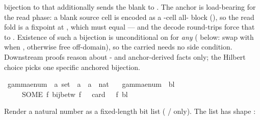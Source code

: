 \begin{isabellebody}
\begin{isamarkuptext}
  bijection to  that additionally sends the
  blank  to .  The anchor is load-bearing for the
  read phase: a blank source cell is encoded as a -cell
  all- block (), so the read fold
  is a fixpoint at , which must equal
   — and the decode round-trips force that to
  .  Existence of such a bijection
  is unconditional on  for \emph{any}
   ( below: swap  with
   when , otherwise free off-domain),
  so the carried  needs no  side
  condition.  Downstream proofs reason about - and
  anchor-derived facts only; the Hilbert choice picks one specific
  anchored bijection.%
\end{isamarkuptext}\isamarkuptrue%
\isamarkupfalse%
\ gamma{\isacharunderscore}{\kern0pt}enum\ {\isacharcolon}{\kern0pt}{\isacharcolon}{\kern0pt}\ {\isachardoublequoteopen}{\isacharprime}{\kern0pt}a\ set\ {\isasymRightarrow}\ {\isacharprime}{\kern0pt}a\ {\isasymRightarrow}\ {\isacharprime}{\kern0pt}a\ {\isasymRightarrow}\ nat{\isachardoublequoteclose}\ \isanewline
\ \ {\isachardoublequoteopen}gamma{\isacharunderscore}{\kern0pt}enum\ {\isasymGamma}\ bl\ {\isacharequal}{\kern0pt}\isanewline
\ \ \ \ \ {\isacharparenleft}{\kern0pt}SOME\ f{\isachardot}{\kern0pt}\ bij{\isacharunderscore}{\kern0pt}betw\ f\ {\isasymGamma}\ {\isacharbraceleft}{\kern0pt}{\isachardot}{\kern0pt}{\isachardot}{\kern0pt}{\isacharless}{\kern0pt}\ card\ {\isasymGamma}{\isacharbraceright}{\kern0pt}\ {\isasymand}\ f\ bl\ {\isacharequal}{\kern0pt}\ {}{\isacharparenright}{\kern0pt}{\isachardoublequoteclose}%
\begin{isamarkuptext}%
Render a natural number as a fixed-length 
  bit list ( /  only).  The list has
  shape :

\end{isamarkuptext}
\end{isabellebody}
